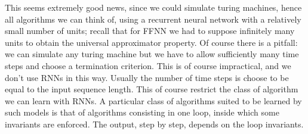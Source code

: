 This seems extremely good news, since we could simulate turing machines, hence all algorithms we can think of, using a recurrent neural network with a relatively small number of units; 
recall that for FFNN we had to suppose infinitely many units to obtain the universal approximator property.
Of course there is a pitfall: we can simulate any turing machine but we have to allow sufficiently many time steps and choose a termination criterion.
This is of course impractical, and we don't use RNNs in this way. Usually the number of time steps is choose to be equal to the input sequence length. This of course restrict the class of algorithm
we can learn with RNNs. A particular class of algorithms suited to be learned by such models is that of algorithms consisting in one loop, inside which some invariants are enforced. The output, step by step,
depends on the loop invariants.





